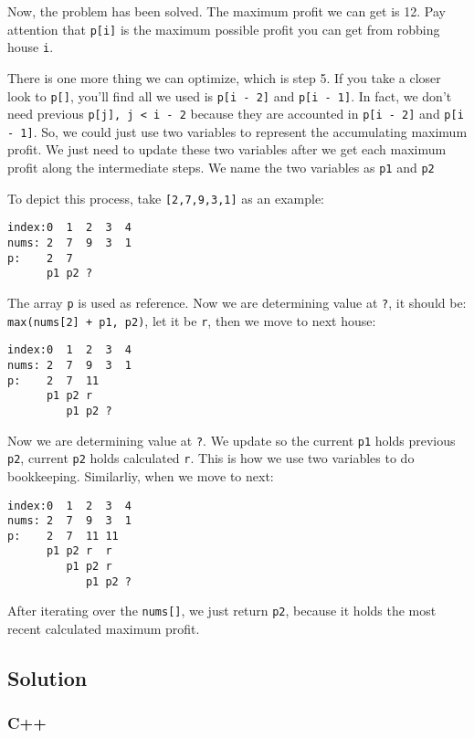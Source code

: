 \documentclass[12pt]{article}
\begin{document}
Now, the problem has been solved. The maximum profit we can get is 12. Pay attention that \texttt{p[i]} is the maximum possible profit you can get from robbing house \texttt{i}.

There is one more thing we can optimize, which is step 5. If you take a closer look to \texttt{p[]}, you'll find all we used is \texttt{p[i - 2]} and \texttt{p[i - 1]}. In fact, we don't need previous \texttt{p[j], j < i - 2} because they are accounted in \texttt{p[i - 2]} and \texttt{p[i - 1]}. So, we could just use two variables to represent the accumulating maximum profit. We just need to update these two variables after we get each maximum profit along the intermediate steps. We name the two variables as \texttt{p1} and \texttt{p2}

To depict this process, take \texttt{[2,7,9,3,1]} as an example:
\begin{verbatim}
index:0  1  2  3  4
nums: 2  7  9  3  1
p:    2  7
      p1 p2 ?
\end{verbatim}
The array \texttt{p} is used as reference. Now we are determining value at \texttt{?}, it should be: \texttt{max(nums[2] + p1, p2)}, let it be \texttt{r}, then we move to next house:
\begin{verbatim}
index:0  1  2  3  4
nums: 2  7  9  3  1
p:    2  7  11
      p1 p2 r
         p1 p2 ?
\end{verbatim}
Now we are determining value at \texttt{?}. We update so the current \texttt{p1} holds previous \texttt{p2}, current \texttt{p2} holds calculated \texttt{r}. This is how we use two variables to do bookkeeping. Similarliy, when we move to next:
\begin{verbatim}
index:0  1  2  3  4
nums: 2  7  9  3  1
p:    2  7  11 11
      p1 p2 r  r
         p1 p2 r
            p1 p2 ?
\end{verbatim}

After iterating over the \texttt{nums[]}, we just return \texttt{p2}, because it holds the most recent calculated maximum profit.

\subsection{Solution}
\label{sec:orgff5a48f}
\subsubsection{C++}
\label{sec:orga9c8ee9}
\end{document}
